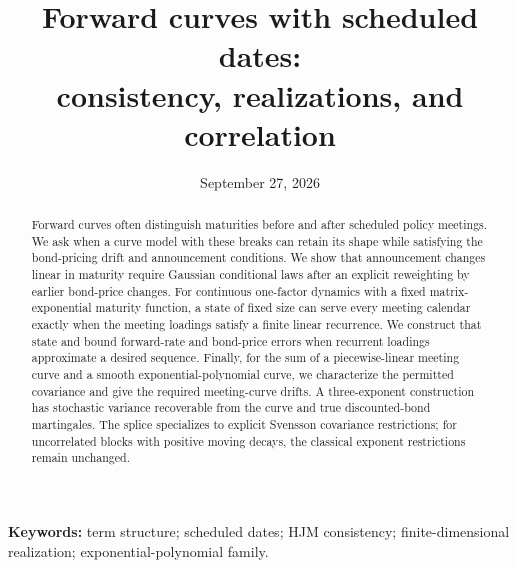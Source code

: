 \documentclass[11pt]{article}
\title{Forward curves with scheduled dates:\\ consistency, realizations, and correlation}
\date{September 27, 2026}
\numberwithin{equation}{section}
\theoremstyle{definition}
\theoremstyle{remark}
\begin{document}
\maketitle
\begin{abstract}
Forward curves often distinguish maturities before and after scheduled policy meetings. We ask when a curve model with these breaks can retain its shape while satisfying the bond-pricing drift and announcement conditions. We show that announcement changes linear in maturity require Gaussian conditional laws after an explicit reweighting by earlier bond-price changes. For continuous one-factor dynamics with a fixed matrix-exponential maturity function, a state of fixed size can serve every meeting calendar exactly when the meeting loadings satisfy a finite linear recurrence. We construct that state and bound forward-rate and bond-price errors when recurrent loadings approximate a desired sequence. Finally, for the sum of a piecewise-linear meeting curve and a smooth exponential-polynomial curve, we characterize the permitted covariance and give the required meeting-curve drifts. A three-exponent construction has stochastic variance recoverable from the curve and true discounted-bond martingales. The splice specializes to explicit Svensson covariance restrictions; for uncorrelated blocks with positive moving decays, the classical exponent restrictions remain unchanged.
\end{abstract}
\noindent\textbf{Keywords:} term structure; scheduled dates; HJM consistency; finite-dimensional realization; exponential-polynomial family.












\appendix




\end{document}
